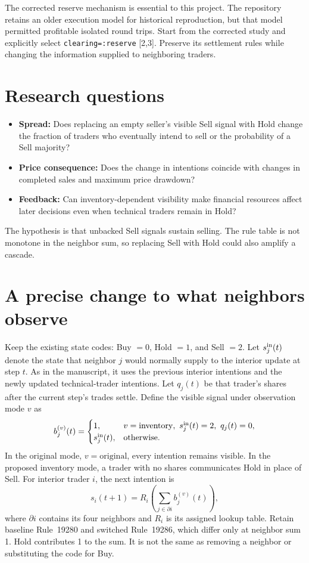 \documentclass[11pt,letterpaper]{article}
\newcommand{\lead}[1]{\textbf{\textcolor{ink}{#1}}}
\begin{document}
The corrected reserve mechanism is essential to this project. The repository retains an older execution model for historical reproduction, but that model permitted profitable isolated round trips. Start from the corrected study and explicitly select \texttt{clearing=:reserve} [2,3]. Preserve its settlement rules while changing the information supplied to neighboring traders.

\section{Research questions}
\begin{itemize}
\item \lead{Spread:} Does replacing an empty seller's visible Sell signal with Hold change the fraction of traders who eventually intend to sell or the probability of a Sell majority?
\item \lead{Price consequence:} Does the change in intentions coincide with changes in completed sales and maximum price drawdown?
\item \lead{Feedback:} Can inventory-dependent visibility make financial resources affect later decisions even when technical traders remain in Hold?
\end{itemize}
The hypothesis is that unbacked Sell signals sustain selling. The rule table is not monotone in the neighbor sum, so replacing Sell with Hold could also amplify a cascade.

\newpage
\section{A precise change to what neighbors observe}
Keep the existing state codes: Buy $=0$, Hold $=1$, and Sell $=2$. Let $s_j^{\rm in}(t)$ denote the state that neighbor $j$ would normally supply to the interior update at step $t$. As in the manuscript, it uses the previous interior intentions and the newly updated technical-trader intentions. Let $q_j(t)$ be that trader's shares after the current step's trades settle. Define the visible signal under observation mode $v$ as
\begin{equation}
 b_j^{(v)}(t)=
 \begin{cases}
  1, & v=\mathrm{inventory},\ s_j^{\rm in}(t)=2,\ q_j(t)=0,\\
  s_j^{\rm in}(t), & \text{otherwise}.
 \end{cases}
 \label{eq:signal}
\end{equation}
In the original mode, $v=\mathrm{original}$, every intention remains visible. In the proposed inventory mode, a trader with no shares communicates Hold in place of Sell. For interior trader $i$, the next intention is
\begin{equation}
 s_i(t+1)=R_i\!\left(\sum_{j\in\partial i}b_j^{(v)}(t)\right),
 \label{eq:update}
\end{equation}
where $\partial i$ contains its four neighbors and $R_i$ is its assigned lookup table. Retain baseline Rule~19280 and switched Rule~19286, which differ only at neighbor sum 1. Hold contributes 1 to the sum. It is not the same as removing a neighbor or substituting the code for Buy.
\end{document}
